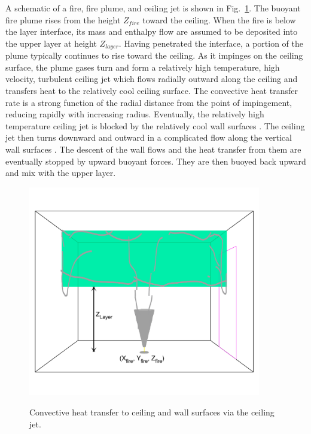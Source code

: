 A schematic of a fire, fire plume, and ceiling jet is shown in Fig.~\ref{fig:CeilJet}. The buoyant fire plume rises from the height $Z_{fire}$ toward the ceiling.  When the fire is below the layer interface, its mass and enthalpy flow are assumed to be deposited into the upper layer at height $Z_{layer}$.  Having penetrated the interface, a portion of the plume typically continues to rise toward the ceiling.  As it impinges on the ceiling surface, the plume gases turn and form a relatively high temperature, high velocity, turbulent ceiling jet which flows radially outward along the ceiling and transfers heat to the relatively cool ceiling surface.  The convective heat transfer rate is a strong function of the radial distance from the point of impingement, reducing rapidly with increasing radius.  Eventually, the relatively high temperature ceiling jet is blocked by the relatively cool wall surfaces \cite{Cooper:1990a}.  The ceiling jet then turns downward and outward in a complicated flow along the vertical wall surfaces \cite{Cooper:1988, Jaluria:1989} .  The descent of the wall flows and the heat transfer from them are eventually stopped by upward buoyant forces.  They are then buoyed back upward and mix with the upper layer.

\begin{figure}
\begin{center}
\includegraphics[width=4.0in]{FIGURES/Theory/CeilJet}\\
\end{center}
\caption{Convective heat transfer to ceiling and wall surfaces via the ceiling jet.}
 \label{fig:CeilJet}
\end{figure}


